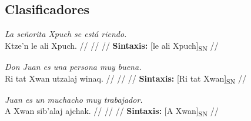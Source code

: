 \documentclass{article}%
\begin{document}
\subsection{Clasificadores}%
\label{subsec:Clasificadores}%

%
\par\medskip%
\ex
\textit{La señorita Xpuch se está riendo.} \\
\begingl
\gla Ktze’n le ali Xpuch. //
\glb  //
\glc  //
\glft \textbf{Sintaxis:} [le ali Xpuch]\textsubscript{SN} //
\endgl
\xe
%
\medskip%
\par\medskip%
\ex
\textit{Don Juan es una persona muy buena.} \\
\begingl
\gla Ri tat Xwan utzalaj winaq. //
\glb  //
\glc  //
\glft \textbf{Sintaxis:} [Ri tat Xwan]\textsubscript{SN} //
\endgl
\xe
%
\medskip%
\par\medskip%
\ex
\textit{Juan es un muchacho muy trabajador.} \\
\begingl
\gla A Xwan sib’alaj ajchak. //
\glb  //
\glc  //
\glft \textbf{Sintaxis:} [A Xwan]\textsubscript{SN} //
\endgl
\xe
%
\medskip

%
\end{document}
